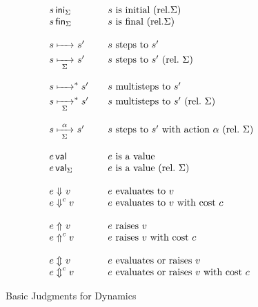 \documentclass[11pt]{article}
\begin{document}
\begin{figure}[p]
    \begin{displaymath}
        \begin{array}{l@{\qquad}l}
            \isIni[\Sigma]{s}            & s\ \text{is initial}\ (\text{rel.} \Sigma) \\
            \isFin[\Sigma]{s}            & s\ \text{is final}\ (\text{rel.} \Sigma) \\\\
            s\stepsTo s'         & s\ \text{steps to}\ s' \\
            s\stepsTo[\Sigma] s' & s\ \text{steps to}\ s'\ (\text{rel.}\ \Sigma)\\\\
            s\stepsTo(\ast) s' & s\ \text{multisteps to}\ s' \\
            s\stepsTo[\Sigma](\ast) s' & s\ \text{multisteps to}\ s'\ (\text{rel.}\ \Sigma) \\\\
            s\stepsTo[\Sigma]<\alpha> s' & s\ \text{steps to}\ s'\ \text{with action}\ \alpha\ (\text{rel.}\ \Sigma) \\\\
            \isVal{e}            &  e\ \text{is a value} \\
            \isVal[\Sigma]{e}    & e\ \text{is a value}\ (\text{rel.}\ \Sigma) \\\\
            e\evalsTo v          & e\ \text{evaluates to}\ v \\
            e\evalsTo(c) v       & e\ \text{evaluates to}\ v\ \text{with cost}\ c \\\\
            e\raises v           & e\ \text{raises}\ v \\
            e\raises(c) v        & e\ \text{raises}\ v\ \text{with cost}\ c \\\\
            e\evalsorraises v    & e\ \text{evaluates or raises}\ v \\
            e\evalsorraises(c) v    & e\ \text{evaluates or raises}\ v\ \text{with cost}\ c
        \end{array}
    \end{displaymath}

    \caption{Basic Judgments for Dynamics}
    \label{fig:dynamics}
\end{figure}
\end{document}
